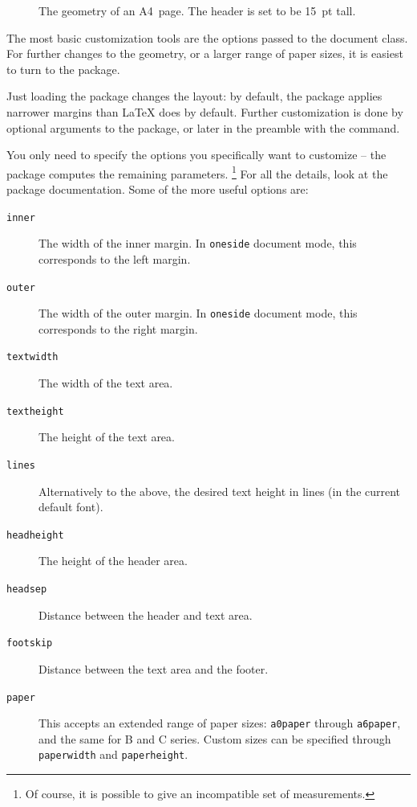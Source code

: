 \begin{figure}
\centering
\setlength\fboxsep{0pt}
\caption{The geometry of an A4~page. The header is set to be 15~pt tall.}
\label{fig:page geometry}
\end{figure}

The most basic customization tools are the options passed to the document class.
For further changes to the geometry, or a larger range of paper sizes,
it is easiest to turn to the  package.

Just loading the  package changes the layout:
by default, the package applies narrower margins than \LaTeX{} does by default.
Further customization is done by optional arguments to the package,
or later in the preamble with the  command.

You only need to specify the options you specifically want to customize
-- the package computes the remaining parameters.%
\footnote{Of course, it is possible to give an incompatible set of measurements.}
For all the details, look at the package documentation.
Some of the more useful options are:
\begin{description}
\item[\texttt{inner}] The width of the inner margin.
    In \verb|oneside| document mode, this corresponds to the left margin.
\item[\texttt{outer}] The width of the outer margin.
    In \verb|oneside| document mode, this corresponds to the right margin.
\item[\texttt{textwidth}] The width of the text area.
\item[\texttt{textheight}] The height of the text area.
\item[\texttt{lines}] Alternatively to the above,
    the desired text height in lines (in the current default font).
\item[\texttt{headheight}] The height of the header area.
\item[\texttt{headsep}] Distance between the header and text area.
\item[\texttt{footskip}] Distance between the text area and the footer.
\item[\texttt{paper}] This accepts an extended range of paper sizes:
    \verb|a0paper| through \verb|a6paper|, and the same for B and C series.
    Custom sizes can be specified through \verb|paperwidth| and \verb|paperheight|.
\end{description}

